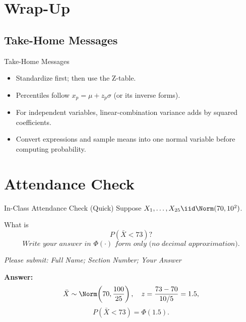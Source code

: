 \documentclass[aspectratio=169]{beamer}
\begin{document}
\section{Wrap-Up}

\subsection{Take-Home Messages}
\begin{frame}{Take-Home Messages}
  \begin{itemize}
    \item Standardize first; then use the Z-table.
    \item Percentiles follow \(x_p=\mu+z_p\sigma\) (or its inverse forms).
    \item For independent variables, linear-combination variance adds by squared coefficients.
    \item Convert expressions and sample means into one normal variable before computing probability.
  \end{itemize}
\end{frame}

\section{Attendance Check}

\begin{frame}{In-Class Attendance Check (Quick)}
  Suppose \(X_1,\dots,X_{25}\iid\Norm(70,10^2)\).

  What is
  \[
    P(\bar X<73)?
  \]
  \[
    \textit{Write your answer in } \Phi(\cdot)\textit{ form only (no decimal approximation).}
  \]

  \vspace{3mm}
  \textit{Please submit: Full Name; Section Number; Your Answer}

  \pause
  \vspace{2mm}
  \textbf{Answer:}
  \[
    \bar X\sim\Norm\!\left(70,\frac{100}{25}\right),\quad
    z=\frac{73-70}{10/5}=1.5,
  \]
  \[
    P(\bar X<73)=\Phi(1.5).
  \]
\end{frame}
\end{document}
